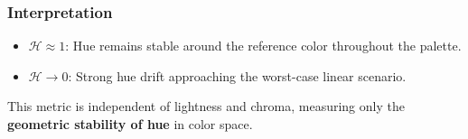\subsubsection{Interpretation}

\begin{itemize}
  \item $\mathcal{H} \approx 1$: Hue remains stable around the reference color
  throughout the palette.
  \item $\mathcal{H} \to 0$: Strong hue drift approaching the worst-case linear
  scenario.
\end{itemize}

This metric is independent of lightness and chroma, measuring only the
\textbf{geometric stability of hue} in color space.
